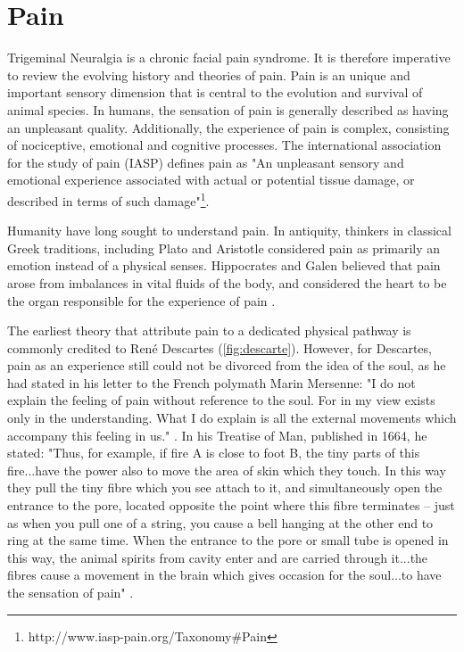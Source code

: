 \section{Pain}

Trigeminal Neuralgia is a chronic facial pain syndrome. It is therefore imperative to review the evolving history and theories of pain. Pain is an unique and important sensory dimension that is central to the evolution and survival of animal species. In humans, the sensation of pain is generally described as having an unpleasant quality. Additionally, the experience of pain is complex, consisting of nociceptive, emotional and cognitive processes. The international association for the study of pain (IASP) defines pain as "An unpleasant sensory and emotional experience associated with actual or potential tissue damage, or described in terms of such damage"\footnote{http://www.iasp-pain.org/Taxonomy\#Pain}. 

Humanity have long sought to understand pain. In antiquity, thinkers in classical Greek traditions, including Plato and Aristotle considered pain as primarily an emotion instead of a physical senses\cite{Moayedi2012a}. Hippocrates and Galen believed that pain arose from imbalances in vital fluids of the body, and considered the heart to be the organ responsible for the experience of pain \cite{Melzack1999}. 

The earliest theory that attribute pain to a dedicated physical pathway is commonly credited to Ren\'{e} Descartes (\ref{fig:descarte}). However, for Descartes, pain as an experience still could not be divorced from the idea of the soul, as he had stated in his letter to the French polymath Marin Mersenne: "I do not explain the feeling of pain without reference to the soul. For in my view exists only in the understanding. What I do explain is all the external movements which accompany this feeling in us." \cite[p. 148]{BookCottingham1991v3}. In his Treatise of Man, published in 1664, he stated: "Thus, for example, if fire A is close to foot B, the tiny parts of this fire...have the power also to move the area of skin which they touch. In this way they pull the tiny fibre which you see attach to it, and simultaneously open the entrance to the pore, located opposite the point where this fibre terminates -- just as when you pull one of a string, you cause a bell hanging at the other end to ring at the same time. When the entrance to the pore or small tube is opened in this way, the animal spirits from cavity enter and are carried through it...the fibres cause a movement in the brain which gives occasion for the soul...to have the sensation of pain" \cite[p.101-103]{BookCottingham1991v1}.

